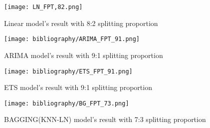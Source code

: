 \documentclass{ieeeojies}
\begin{document}
\begin{figure}[H]
  \centering
  \begin{minipage}{0.8\linewidth}
    \centering
    \texttt{[image: LN\_FPT,82.png]}
    \caption{Linear model's result with 8:2 splitting proportion}
    \label{fig15}
  \end{minipage}
\end{figure}
\begin{figure}[H]
  \centering
  \begin{minipage}{0.8\linewidth}
    \centering
    \texttt{[image: bibliography/ARIMA\_FPT\_91.png]}
    \caption{ARIMA model's result with 9:1 splitting proportion}
    \label{fig16}
  \end{minipage}
\end{figure}
\begin{figure}[H]
  \centering
  \begin{minipage}{0.8\linewidth}
    \centering
    \texttt{[image: bibliography/ETS\_FPT\_91.png]}
    \caption{ETS model's result with 9:1 splitting proportion}
    \label{fig17}
  \end{minipage}
\end{figure}
\begin{figure}[H]
  \centering
  \begin{minipage}{0.8\linewidth}
    \centering
    \texttt{[image: bibliography/BG\_FPT\_73.png]}
    \caption{BAGGING(KNN-LN) model's result with 7:3 splitting proportion}
    \label{fig17}
  \end{minipage}
\end{figure}
\end{document}
